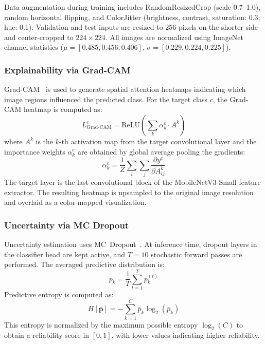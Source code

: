 \documentclass[conference]{IEEEtran}
\begin{document}
Data augmentation during training includes RandomResizedCrop (scale 0.7--1.0), random horizontal flipping, and ColorJitter (brightness, contrast, saturation: 0.3; hue: 0.1). Validation and test inputs are resized to 256 pixels on the shorter side and center-cropped to $224 \times 224$. All images are normalized using ImageNet channel statistics ($\mu = [0.485, 0.456, 0.406]$, $\sigma = [0.229, 0.224, 0.225]$).

\subsubsection{Explainability via Grad-CAM}
Grad-CAM~\cite{selvaraju2017grad} is used to generate spatial attention heatmaps indicating which image regions influenced the predicted class. For the target class $c$, the Grad-CAM heatmap is computed as:
\begin{equation}
  L_{\text{Grad-CAM}}^{c} = \text{ReLU}\!\left(\sum_{k} \alpha_{k}^{c} \cdot A^{k}\right)
\end{equation}
where $A^{k}$ is the $k$-th activation map from the target convolutional layer and the importance weights $\alpha_{k}^{c}$ are obtained by global average pooling the gradients:
\begin{equation}
  \alpha_{k}^{c} = \frac{1}{Z} \sum_{i} \sum_{j} \frac{\partial y^{c}}{\partial A_{ij}^{k}}
\end{equation}
The target layer is the last convolutional block of the MobileNetV3-Small feature extractor. The resulting heatmap is upsampled to the original image resolution and overlaid as a color-mapped visualization.

\subsubsection{Uncertainty via MC Dropout}
Uncertainty estimation uses MC~Dropout~\cite{gal2016dropout}. At inference time, dropout layers in the classifier head are kept active, and $T = 10$ stochastic forward passes are performed. The averaged predictive distribution is:
\begin{equation}
  \bar{p}_{k} = \frac{1}{T} \sum_{t=1}^{T} p_{k}^{(t)}
\end{equation}
Predictive entropy is computed as:
\begin{equation}
  H[\bar{\mathbf{p}}] = -\sum_{k=1}^{C} \bar{p}_{k} \log_{2}(\bar{p}_{k})
\end{equation}
This entropy is normalized by the maximum possible entropy $\log_{2}(C)$ to obtain a reliability score in $[0, 1]$, with lower values indicating higher reliability.
\end{document}
